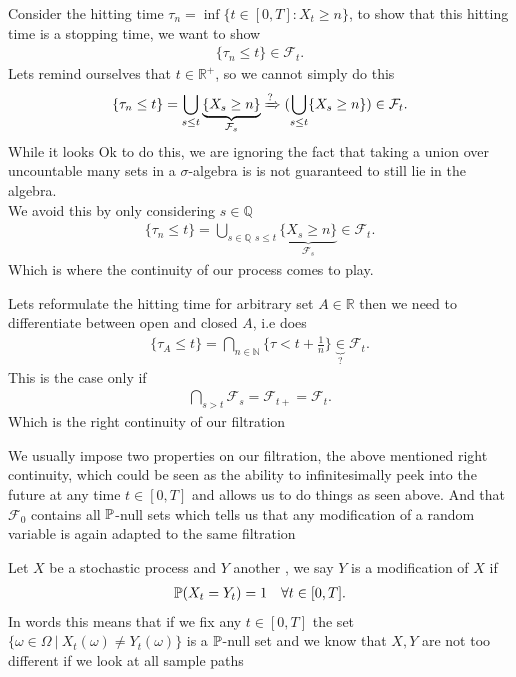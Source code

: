   \begin{Example}
  Consider the hitting time $\tau_n = \inf \{t \in  [0,T] : X_t \ge n\}  $, to show that this hitting time is a stopping time, we want to show 
  \begin{align*}
    \{\tau_n \le  t\}   \in  \mathcal{F}_t
  .\end{align*}
  Lets remind ourselves that $t \in  \mathbb{R}^{+} $, so we cannot simply do this 
  \begin{align*}
    \{\tau_n \le  t\} = \bigcup_{s \le  t} \underbrace{\{X_s \ge n \}}_{\mathcal{F}_s} \xRightarrow{?} (\bigcup_{s \le  t} \{X_s \ge n \})   \in \mathcal{F}_t
  .\end{align*}
  While it looks Ok to do this, we are  ignoring the fact that taking a union over uncountable many sets in a $\sigma$-algebra is is not guaranteed to still lie in the algebra.\\[1ex]
  We avoid this by only considering $s \in  \mathbb{Q}$
  \begin{align*}
  \{\tau_n \le  t\} = \bigcup_{s \in  \mathbb{Q} \, \ s \le  t} \underbrace{\{X_s \ge n \}}_{\mathcal{F}_s} \in  \mathcal{F}_t 
  .\end{align*}  
  Which is where the continuity of our process comes to play.
  \end{Example}
  \begin{remark}
    Lets reformulate the hitting time for arbitrary set $A \in  \mathbb{R}$  then we need to differentiate between 
    open and closed $A$, i.e does 
    \begin{align*}
      \{\tau_A \le  t\} = \bigcap_{n \in  \mathbb{N}} \{\tau < t + \frac{1}{n}\}  \underbrace{\in }_{?} \mathcal{F}_{t} 
    .\end{align*}
    This is the case only if 
    \begin{align*}
      \bigcap_{s > t} \mathcal{F}_s = \mathcal{F}_{t+} = \mathcal{F}_t
    .\end{align*}
    Which is the right continuity of our filtration
  \end{remark}
  We usually impose two properties on our filtration, the above mentioned right continuity, which could be seen as the ability to infinitesimally peek into the future at any time $t \in  [0,T]$ and allows us
  to do things as seen above. And that $\mathcal{F}_0$ contains all $\P$-null sets which tells us that any modification of a random variable is again adapted to the same filtration
  \begin{Definition}[Modification]
    Let $X$ be a stochastic process and $Y$ another , we say $Y$ is a modification of $X$ if  
    \begin{align*}
      \P(X_t=Y_t) = 1 \quad \forall  t \in  [0,T]
    .\end{align*}
    In words this means that if we fix any $t \in [0,T]$ the set $\{\omega  \in  \Omega \ | \ X_t(\omega ) \neq  Y_t(\omega ) \}  $ is a $\P$-null set and we know 
    that $X,Y$ are not too different if we look at all sample paths
  \end{Definition}
